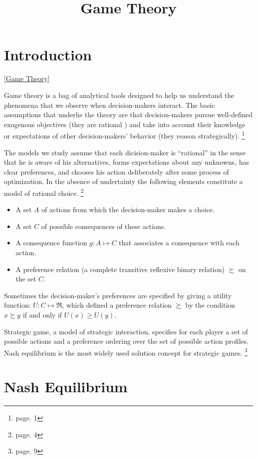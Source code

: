 \title{Game Theory}

\section{Introduction}

[\href{https://en.wikipedia.org/wiki/Game_theory}{Game Theory}]

Game theory is a bag of analytical tools designed to help us understand
the phenomena that we observe when decision-makers interact. The basic
assumptions that underlie the theory are that decision-makers pursue
well-defined exogenous objectives (they are rational ) and take into
account their knowledge or expectations of other decision-makers’ behavior
(they reason strategically). \footnote{page. 1}

The models we study assume that each dicision-maker is ``rational'' in
the sense that he is aware of his alternatives, forms expectations about
any unknowns, has clear preferences, and chooses his action deliberately
after some process of optimization. In the absence of undertainty the
following elements constitute a model of rational choice. \footnote{page. 4}
\begin{itemize}
	\item A set $A$ of actions from which the decision-maker makes a choice.
	\item A set $C$ of possible consequences of these actions.
	\item A consequence function $g: A\mapsto C$ that associates a consequence
		with each action.
	\item A preference relation (a complete transitive reflexive binary
		relation) $\succsim$ on the set $C$.
\end{itemize}

Sometimes the decision-maker's preferences are specified by giving a utility
function: $U: C\mapsto \Re$, which defined a preference relation $\succsim$
by the condition $x\succsim y$ if and only if $U(x)\geqslant U(y)$.

Strategic game, a model of strategic interaction, specifies for each player
a set of possible actions and a preference ordering over the set of possible
action profiles. Nash equilibrium is the most widely used solution concept
for strategic games. \footnote{page. 9}

\section{Nash Equilibrium}

